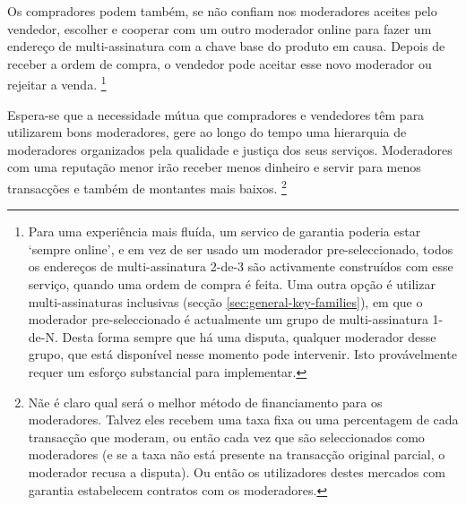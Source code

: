 Os compradores podem também, se não confiam nos moderadores aceites pelo vendedor, escolher e cooperar com um outro moderador online para fazer um endereço de multi-assinatura com a chave base do produto em causa. Depois de receber a ordem de compra, o vendedor pode aceitar esse novo moderador ou rejeitar a venda. 
\footnote{Para uma experiência mais fluída, um servico de garantia poderia estar `sempre online', e em vez de ser usado um moderador pre-seleccionado, todos os endereços de multi-assinatura 2-de-3 são activamente construídos com esse serviço, quando uma ordem de compra é feita. Uma outra opção é utilizar multi-assinaturas inclusivas (secção \ref{sec:general-key-families}), em que o moderador pre-seleccionado é actualmente um grupo de multi-assinatura 1-de-N. Desta forma sempre que há uma disputa, qualquer moderador desse grupo, que está disponível nesse momento pode intervenir. Isto provávelmente requer um esforço substancial para implementar.}     

Espera-se que a necessidade mútua que compradores e vendedores têm para utilizarem bons moderadores, gere ao longo do tempo uma hierarquia de moderadores organizados pela qualidade e justiça dos seus serviços. Moderadores com uma reputação menor irão receber menos dinheiro e servir para menos transacções e também de montantes mais baixos.  
\footnote{Nãe é claro qual será o melhor método de financiamento para os moderadores. Talvez eles recebem uma taxa fixa ou uma percentagem de cada transacção que moderam, ou então cada vez que são seleccionados como moderadores (e se a taxa não está presente na transacção original parcial, o moderador recusa a disputa). Ou então os utilizadores destes mercados com garantia estabelecem contratos com os moderadores.}  

